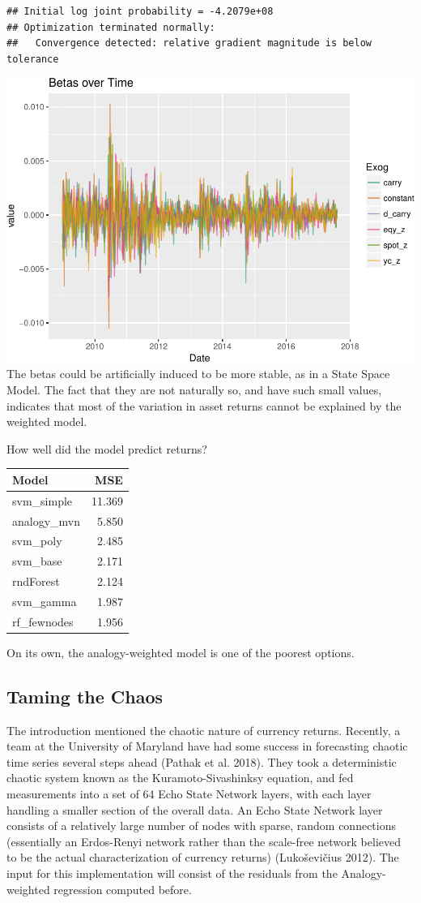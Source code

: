 \documentclass[]{article}
\begin{document}
\begin{verbatim}
## Initial log joint probability = -4.2079e+08
## Optimization terminated normally: 
##   Convergence detected: relative gradient magnitude is below tolerance
\end{verbatim}

\includegraphics{Econometric_FX_Forecasting_files/figure-latex/unnamed-chunk-4-1.pdf}
The betas could be artificially induced to be more stable, as in a State
Space Model. The fact that they are not naturally so, and have such
small values, indicates that most of the variation in asset returns
cannot be explained by the weighted model.

How well did the model predict returns?

\begin{longtable}[]{@{}lr@{}}
\toprule
Model & MSE\tabularnewline
\midrule
\endhead
svm\_simple & 11.369\tabularnewline
analogy\_mvn & 5.850\tabularnewline
svm\_poly & 2.485\tabularnewline
svm\_base & 2.171\tabularnewline
rndForest & 2.124\tabularnewline
svm\_gamma & 1.987\tabularnewline
rf\_fewnodes & 1.956\tabularnewline
\bottomrule
\end{longtable}

On its own, the analogy-weighted model is one of the poorest options.

\subsection{Taming the Chaos}\label{taming-the-chaos}

The introduction mentioned the chaotic nature of currency returns.
Recently, a team at the University of Maryland have had some success in
forecasting chaotic time series several steps ahead (Pathak et al.
2018). They took a deterministic chaotic system known as the
Kuramoto-Sivashinksy equation, and fed measurements into a set of 64
Echo State Network layers, with each layer handling a smaller section of
the overall data. An Echo State Network layer consists of a relatively
large number of nodes with sparse, random connections (essentially an
Erdos-Renyi network rather than the scale-free network believed to be
the actual characterization of currency returns) (Lukoševičius 2012).
The input for this implementation will consist of the residuals from the
Analogy-weighted regression computed before.
\end{document}

